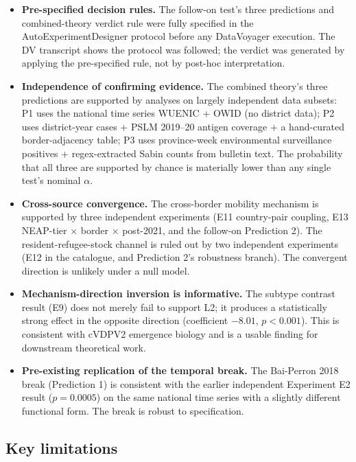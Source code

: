 \documentclass[11pt]{article}
\begin{document}
\begin{itemize}[noitemsep]
\item \textbf{Pre-specified decision rules.} The follow-on test's three predictions and combined-theory verdict rule were fully specified in the AutoExperimentDesigner protocol before any DataVoyager execution. The DV transcript shows the protocol was followed; the verdict was generated by applying the pre-specified rule, not by post-hoc interpretation.
\item \textbf{Independence of confirming evidence.} The combined theory's three predictions are supported by analyses on largely independent data subsets: P1 uses the national time series WUENIC + OWID (no district data); P2 uses district-year cases + PSLM 2019--20 antigen coverage + a hand-curated border-adjacency table; P3 uses province-week environmental surveillance positives + regex-extracted Sabin counts from bulletin text. The probability that all three are supported by chance is materially lower than any single test's nominal $\alpha$.
\item \textbf{Cross-source convergence.} The cross-border mobility mechanism is supported by three independent experiments (E11 country-pair coupling, E13 NEAP-tier $\times$ border $\times$ post-2021, and the follow-on Prediction 2). The resident-refugee-stock channel is ruled out by two independent experiments (E12 in the catalogue, and Prediction 2's robustness branch). The convergent direction is unlikely under a null model.
\item \textbf{Mechanism-direction inversion is informative.} The subtype contrast result (E9) does not merely fail to support L2; it produces a statistically strong effect in the opposite direction (coefficient $-8.01$, $p<0.001$). This is consistent with cVDPV2 emergence biology and is a usable finding for downstream theoretical work.
\item \textbf{Pre-existing replication of the temporal break.} The Bai-Perron 2018 break (Prediction 1) is consistent with the earlier independent Experiment E2 result ($p{=}0.0005$) on the same national time series with a slightly different functional form. The break is robust to specification.
\end{itemize}

\subsection{Key limitations}
\end{document}
